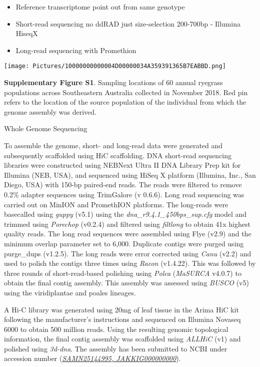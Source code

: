 \begin{itemize}
\tightlist
\item
  Reference transcriptome point out from same genotype
\item
  Short-read sequencing no ddRAD just size-selection 200-700bp -
  Illumina HiseqX
\item
  Long-read sequencing with Promethion
\end{itemize}

\texttt{[image: Pictures/10000000000004D00000034A359391365B7EABBD.png]}\protect\hypertarget{anchor-6}{}{}

\textbf{Supplementary Figure S1}. Sampling locations of 60 annual
ryegrass populations across Southeastern Australia collected in November
2018. Red pin refers to the location of the source population of the
individual from which the genome assembly was derived.

\protect\hypertarget{anchor-7}{}{}Whole Genome Sequencing

To assemble the genome, short- and long-read data were generated and
subsequently scaffolded using HiC scaffolding. DNA short-read sequencing
libraries were constructed using NEBNext Ultra II DNA Library Prep kit
for Illumina (NEB, USA), and sequenced using HiSeq X platform (Illumina,
Inc., San Diego, USA) with 150-bp paired-end reads. The reads were
filtered to remove 0.2\% adapter sequences using TrimGalore (v 0.6.6).
Long read sequencing was carried out on MinION and PromethION platforms.
The long-reads were basecalled using \emph{guppy }(v5.1) using the
\emph{dna\_r9.4.1\_450bps\_sup.cfg} model and trimmed using
\emph{Porechop} (v0.2.4) and filtered using \emph{filtlong} to obtain
41x highest quality reads. The long read sequences were assembled using
Flye (v2.9) and the minimum overlap parameter set to 6,000. Duplicate
contigs were purged using purge\_dups (v1.2.5). The long reads were
error corrected using \emph{Canu} (v2.2) and used to polish the contigs
three times using \emph{Racon} (v1.4.22). This was followed by three
rounds of short-read-based polishing using \emph{Polca} (\emph{MaSURCA}
v4.0.7) to obtain the final contig assembly. This assembly was assessed
using \emph{BUSCO} (v5) using the viridiplantae and poales lineages.

A Hi-C library was generated using 20mg of leaf tissue in the Arima HiC
kit following the manufacturer's instructions and sequenced on Illumina
Novaseq 6000 to obtain 500 million reads. Using the resulting genomic
topological information, the final contig assembly was scaffolded using
\emph{ALLHiC} (v1) and polished using \emph{3d-dna}. The assembly has
been submitted to NCBI under accession number
(\href{https://www.ncbi.nlm.nih.gov/nuccore/2206643664\#sequence_JAKKIG000000000.1}{\emph{SAMN25144995,
JAKKIG000000000}}).

